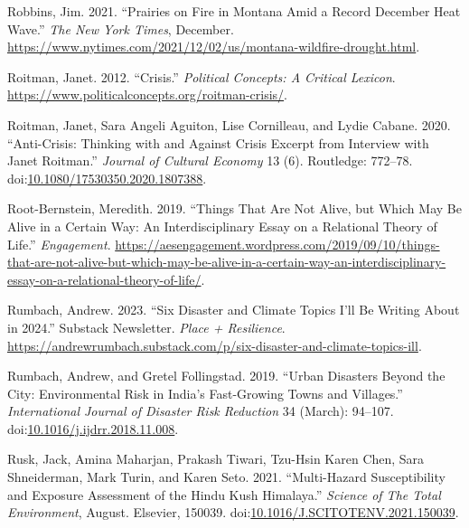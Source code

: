 \documentclass[
]{article}
\newlength{\cslhangindent}
\newenvironment{CSLReferences}[2] %
 {\begin{list}{}{%
  \setlength{\itemindent}{0pt}
  \setlength{\leftmargin}{0pt}
  \setlength{\parsep}{0pt}
  \ifodd #1
   \setlength{\leftmargin}{\cslhangindent}
   \setlength{\itemindent}{-1\cslhangindent}
  \fi
  \setlength{\itemsep}{#2\baselineskip}}}
 {\end{list}}
\begin{document}
\begin{CSLReferences}{1}{0}
Robbins, Jim. 2021. {``Prairies on {Fire} in {Montana Amid} a {Record December Heat Wave}.''} \emph{The New York Times}, December. \url{https://www.nytimes.com/2021/12/02/us/montana-wildfire-drought.html}.

Roitman, Janet. 2012. {``Crisis.''} \emph{Political Concepts: A Critical Lexicon}. \url{https://www.politicalconcepts.org/roitman-crisis/}.

Roitman, Janet, Sara Angeli Aguiton, Lise Cornilleau, and Lydie Cabane. 2020. {``Anti-{Crisis}: Thinking with and Against Crisis Excerpt from Interview with {Janet Roitman}.''} \emph{Journal of Cultural Economy} 13 (6). Routledge: 772--78. doi:\href{https://doi.org/10.1080/17530350.2020.1807388}{10.1080/17530350.2020.1807388}.

Root-Bernstein, Meredith. 2019. {``Things {That Are Not Alive}, but {Which May Be Alive} in a {Certain Way}: {An Interdisciplinary Essay} on a {Relational Theory} of {Life}.''} \emph{Engagement}. \url{https://aesengagement.wordpress.com/2019/09/10/things-that-are-not-alive-but-which-may-be-alive-in-a-certain-way-an-interdisciplinary-essay-on-a-relational-theory-of-life/}.

Rumbach, Andrew. 2023. {``Six {Disaster} and {Climate Topics I}'ll Be {Writing About} in 2024.''} Substack Newsletter. \emph{Place + Resilience}. \url{https://andrewrumbach.substack.com/p/six-disaster-and-climate-topics-ill}.

Rumbach, Andrew, and Gretel Follingstad. 2019. {``Urban Disasters Beyond the City: {Environmental} Risk in {India}'s Fast-Growing Towns and Villages.''} \emph{International Journal of Disaster Risk Reduction} 34 (March): 94--107. doi:\href{https://doi.org/10.1016/j.ijdrr.2018.11.008}{10.1016/j.ijdrr.2018.11.008}.

Rusk, Jack, Amina Maharjan, Prakash Tiwari, Tzu-Hsin Karen Chen, Sara Shneiderman, Mark Turin, and Karen Seto. 2021. {``Multi-Hazard Susceptibility and Exposure Assessment of the {Hindu Kush Himalaya}.''} \emph{Science of The Total Environment}, August. Elsevier, 150039. doi:\href{https://doi.org/10.1016/J.SCITOTENV.2021.150039}{10.1016/J.SCITOTENV.2021.150039}.


\end{CSLReferences}
\end{document}
